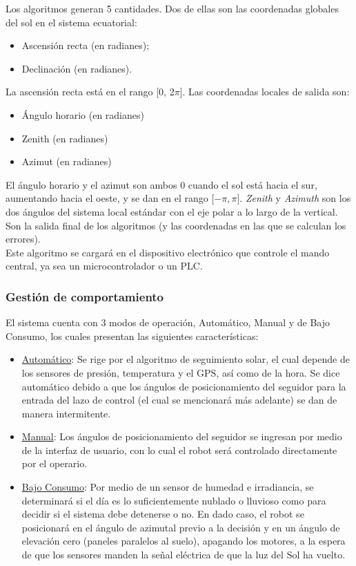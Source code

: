 Los algoritmos generan 5 cantidades. Dos de ellas son las coordenadas globales del sol en el sistema ecuatorial:

\begin{itemize}
	\item Ascensión recta (en radianes);
	\item Declinación (en radianes).
\end{itemize}
La ascensión recta está en el rango [0, 2$\pi$]. Las coordenadas locales de salida son:
\begin{itemize}
	\item Ángulo horario (en radianes)
	\item Zenith (en radianes)
	\item Azimut (en radianes)
\end{itemize}

El ángulo horario y el azimut son ambos 0 cuando el sol está hacia el sur, aumentando hacia el oeste, y se dan en el rango [$-\pi , \pi$]. \textit{Zenith} y \textit{Azimuth} son los dos ángulos del sistema local estándar con el eje polar a lo largo de la vertical. Son la salida final de los algoritmos (y las coordenadas en las que se calculan los errores).\\

Este algoritmo se cargará en el dispositivo electrónico que controle el mando central, ya sea un microcontrolador o un PLC.\\

\subsubsection{Gestión de comportamiento}
El sistema cuenta con 3 modos de operación, Automático, Manual y de Bajo Consumo, los cuales presentan las siguientes características:

\begin{itemize}
	\item \underline{Automático}: Se rige por el algoritmo de seguimiento solar, el cual depende de los sensores de presión, temperatura y el GPS, así como de la hora. Se dice automático debido a que los ángulos de posicionamiento del seguidor para la entrada del lazo de control (el cual se mencionará más adelante) se dan de manera intermitente.
	\item \underline{Manual}: Los ángulos de posicionamiento del seguidor se ingresan por medio de la interfaz de usuario, con lo cual el robot será controlado directamente por el operario.
	\item \underline{Bajo Consumo}: Por medio de un sensor de humedad e irradiancia, se determinará si el día es lo suficientemente nublado o lluvioso como para decidir si el sistema debe detenerse o no. En dado caso, el robot se posicionará en el ángulo de azimutal previo a la decisión y en un ángulo de elevación cero (paneles paralelos al suelo), apagando los motores, a la espera de que los sensores manden la señal eléctrica de que la luz del Sol ha vuelto.
\end{itemize}

